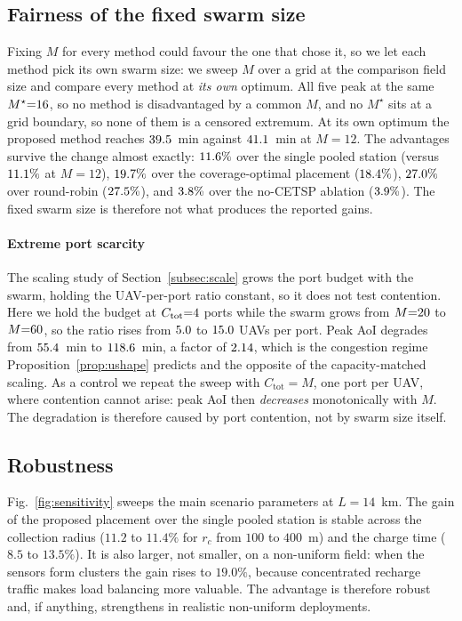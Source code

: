 \subsection{Fairness of the fixed swarm size}
\label{sec:permstar}
Fixing $M$ for every method could favour the one that chose it, so we let each method
pick its own swarm size: we sweep $M$ over a grid at the comparison field size and
compare every method at \emph{its own} optimum. All five peak at the same
$M^\star{=}16$, so no method is disadvantaged by a common $M$, and no
$M^\star$ sits at a grid boundary, so none of them is a censored extremum. At its own
optimum the proposed method reaches $39.5$~min against
$41.1$~min at $M{=}12$. The advantages survive the change almost exactly:
$11.6\%$ over the single pooled station (versus
$11.1\%$ at $M{=}12$), $19.7\%$ over the coverage-optimal
placement ($18.4\%$), $27.0\%$ over round-robin
($27.5\%$), and $3.8\%$ over the no-CETSP ablation
($3.9\%$). The fixed swarm size is therefore not what produces the
reported gains.

\paragraph*{Extreme port scarcity}
The scaling study of Section~\ref{subsec:scale} grows the port budget with the swarm,
holding the UAV-per-port ratio constant, so it does not test contention. Here we hold the budget at $C_{\mathrm{tot}}{=}4$ ports while the swarm grows from
$M{=}20$ to $M{=}60$, so the ratio rises from $5.0$ to
$15.0$ UAVs per port. Peak AoI degrades from $55.4$~min to
$118.6$~min, a factor of $2.14$, which is the congestion regime
Proposition~\ref{prop:ushape} predicts and the opposite of the capacity-matched
scaling. As a control we repeat the sweep with $C_{\mathrm{tot}}{=}M$, one port per
UAV, where contention cannot arise: peak AoI then \emph{decreases} monotonically with
$M$. The degradation is therefore caused by port contention, not by swarm size itself.

\subsection{Robustness}
Fig.~\ref{fig:sensitivity} sweeps the main scenario parameters at $L=14$~km. The
gain of the proposed placement over the single pooled station is stable across
the collection radius ($11.2$ to $11.4\%$ for $r_c$ from $100$ to $400$~m) and
the charge time ($8.5$ to $13.5\%$). It is also larger, not smaller, on a
non-uniform field: when the sensors form clusters the gain rises to $19.0\%$,
because concentrated recharge traffic makes load balancing more valuable. The
advantage is therefore robust and, if anything, strengthens in realistic
non-uniform deployments.

